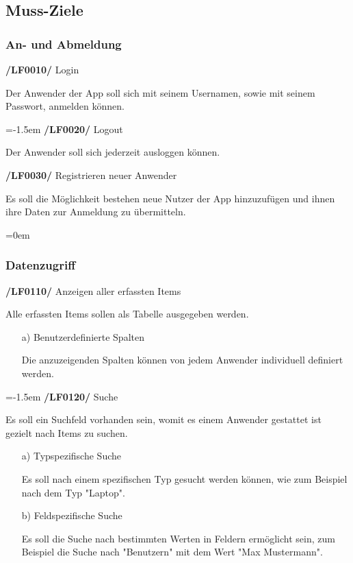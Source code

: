 \documentclass[11pt,a4paper]{report}
\begin{document}
\subsection{Muss-Ziele}
\subsubsection{An- und Abmeldung}
\textbf{/LF0010/} Login
\par
\begingroup
\leftskip=1cm
\noindent Der Anwender der App soll sich mit seinem Usernamen, sowie mit seinem Passwort, anmelden können.\\
\par
\endgroup

\leftskip=-1.5em
\textbf{/LF0020/} Logout
\par
\begingroup
\leftskip=1cm
\noindent Der Anwender soll sich jederzeit ausloggen können.\\
\par
\endgroup

\textbf{/LF0030/} Registrieren neuer Anwender
\par
\begingroup
\leftskip=1cm
\noindent Es soll die Möglichkeit bestehen neue Nutzer der App hinzuzufügen und ihnen ihre Daten zur Anmeldung zu übermitteln.\\
\par
\endgroup

\leftskip=0em
\subsubsection{Datenzugriff}
\textbf{/LF0110/} Anzeigen aller erfassten Items
\par
\begingroup
\leftskip=1cm
\noindent Alle erfassten Items sollen als Tabelle ausgegeben werden.
\begin{enumerate}
\leftskip=3em
\item[a)] Benutzerdefinierte Spalten
\item[] Die anzuzeigenden Spalten können von jedem Anwender individuell definiert werden.
\end{enumerate}
\par
\endgroup

\leftskip=-1.5em
\textbf{/LF0120/} Suche
\par
\begingroup
\leftskip=1cm
\noindent Es soll ein Suchfeld vorhanden sein, womit es einem Anwender gestattet ist gezielt nach Items zu suchen.
\begin{enumerate}
\leftskip=3em
\item[a)] Typspezifische Suche
\item[] Es soll nach einem spezifischen Typ gesucht werden können, wie zum Beispiel nach dem Typ "Laptop".
\item[b)]Feldspezifische Suche
\item[] Es soll die Suche nach bestimmten Werten in Feldern ermöglicht sein, zum Beispiel die Suche nach "Benutzern" mit dem Wert "Max Mustermann".
\end{enumerate}
\par
\endgroup
\end{document}
